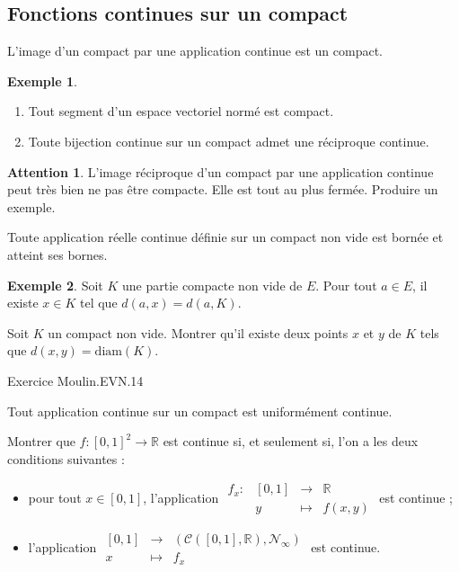 \documentclass[french]{article}
\newcommand{\R}{\mathbb{R}}
\theoremstyle{plain}
\theoremstyle{definition}
\newtheorem*{ex}{Exemple}
\newtheorem*{attention}{Attention}
\theoremstyle{remark}
\begin{document}
\subsection{Fonctions continues sur un compact}

\begin{prop}%
	L'image d'un compact par une application continue est un compact.
\end{prop}

\begin{ex}
	\begin{enumerate}
		\item Tout segment d'un espace vectoriel normé est compact.
		\item Toute bijection continue sur un compact admet une réciproque continue.
	\end{enumerate}
\end{ex}

\begin{attention}
	L'image réciproque d'un compact par une application continue peut très bien ne pas être compacte. Elle est tout au plus fermée. Produire un exemple.
\end{attention}

\begin{thm}%
	Toute application réelle continue définie sur un compact non vide est bornée et atteint ses bornes.
\end{thm}

\begin{ex}
	Soit $K$ une partie compacte non vide de $E$. Pour tout $a\in E$, il existe $x\in K$ tel que $d(a,x)=d(a,K)$.
\end{ex}

\begin{exo}
	Soit $K$ un compact non vide. Montrer qu'il existe deux points $x$ et $y$ de $K$ tels que $d(x,y)=\text{diam}(K)$.
\end{exo}

Exercice Moulin.EVN.14

\begin{thm}%
	Tout application continue sur un compact est uniformément continue.
\end{thm}

\begin{exo}
	Montrer que $f:[0,1]^2\to\R$ est continue si, et seulement si, l'on a les deux conditions suivantes :
	\begin{itemize}
		\item pour tout $x\in[0,1]$, l'application $\begin{array}{lrcl}
			f_x:&[0,1]&\longrightarrow&\R\\
			&y&\longmapsto&f(x,y)
		\end{array}$ est continue ;
		\item l'application $\begin{array}{lrcl}
			[0,1]&\longrightarrow&(\mathcal{C}([0,1],\R),\mathcal{N}_\infty)\\
			x&\longmapsto&f_x
		\end{array}$ est continue.
	\end{itemize}
\end{exo}
\end{document}
